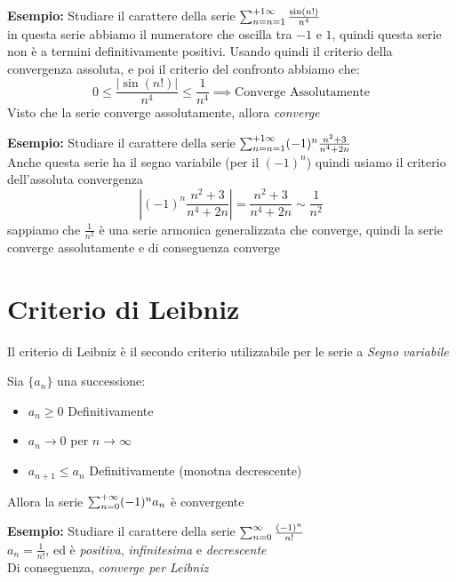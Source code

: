\documentclass[12pt, a4paper, openany]{book}
\newcommand{\esempio}[1]{\begin{box_esempio} \textbf{Esempio: }#1\end{box_esempio}}
\newcommand{\definizione}[1]{\begin{box_definizione} #1 \end{box_definizione}}
\begin{document}
\esempio{
    Studiare il carattere della serie $\sum_{n=n=1}^{+1\infty} \frac{\sin (n!)}{n^4}$
    \\ in questa serie abbiamo il numeratore che oscilla tra $-1$ e $1$, quindi questa serie non è a termini definitivamente positivi.
    Usando quindi il criterio della convergenza assoluta, e poi il criterio del confronto abbiamo che:
    $$ 0 \leq \frac{|\sin (n!)|}{n^4} \leq \frac{1}{n^4} \implies \text{Converge Assolutamente}$$
    Visto che la serie converge assolutamente, allora \emph{converge}
}
\esempio{
    Studiare il carattere della serie $\sum_{n=n=1}^{+1\infty} (-1)^n \frac{n^2 + 3}{n^4+2n}$
    \\Anche questa serie ha il segno variabile (per il $(-1)^n$) quindi usiamo il criterio dell'assoluta convergenza
    $$ |(-1)^n \frac{n^2 + 3}{n^4+2n}| = \frac{n^2 + 3}{n^4+2n} \sim \frac{1}{n^2} $$
    sappiamo che $\frac{1}{n^2}$ è una serie armonica generalizzata che converge, quindi la serie converge assolutamente e di conseguenza converge
}
\section{Criterio di Leibniz}
Il criterio di Leibniz è il secondo criterio utilizzabile per le serie a \emph{Segno variabile}
\definizione{
    Sia $\{a_n\}$ una successione:
    \begin{itemize}
        \item $a_n \geq 0$ Definitivamente
        \item $a_n \to 0$ per $n \to \infty$
        \item $a_{n+1} \leq a_n$ Definitivamente (monotna decrescente) 
    \end{itemize}
    Allora la serie $\sum_{n=0}^{+\infty}(-1)^na_n$ è convergente
}

\esempio{
    Studiare il carattere della serie $\sum_{n=0}^{\infty} \frac{(-1)^n}{n!}$
    \\$a_n = \frac{1}{n!}$, ed è \emph{positiva}, \emph{infinitesima} e \emph{decrescente}
    \\Di conseguenza, \emph{converge per Leibniz}
}
\end{document}
